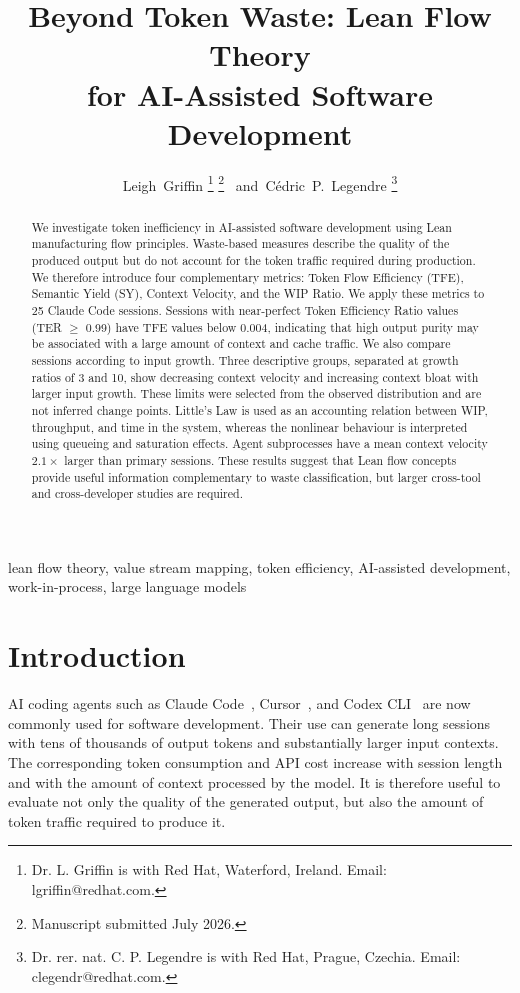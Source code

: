 \documentclass[journal]{IEEEtran}
\title{Beyond Token Waste: Lean Flow Theory\\
       for AI-Assisted Software Development}
\author{Leigh~Griffin%
  \thanks{Dr. L. Griffin is with Red Hat, Waterford, Ireland.
  Email: lgriffin@redhat.com.}%
  \thanks{Manuscript submitted July 2026.}%
  ~and~C\'{e}dric~P.~Legendre%
  \thanks{Dr. rer. nat. C. P. Legendre is with Red Hat, Prague, Czechia.
  Email: clegendr@redhat.com.}%
}
\begin{document}
\maketitle

\begin{abstract}
We investigate token inefficiency in AI-assisted software development using Lean manufacturing flow principles. Waste-based measures describe the quality of the produced output but do not account for the token traffic required during production. We therefore introduce four complementary metrics: Token Flow Efficiency (TFE), Semantic Yield (SY), Context Velocity, and the WIP Ratio. We apply these metrics to 25 Claude Code sessions. Sessions with near-perfect Token Efficiency Ratio values (TER $\geq$ 0.99) have TFE values below 0.004, indicating that high output purity may be associated with a large amount of context and cache traffic. We also compare sessions according to input growth. Three descriptive groups, separated at growth ratios of 3 and 10, show decreasing context velocity and increasing context bloat with larger input growth. These limits were selected from the observed distribution and are not inferred change points. Little's Law is used as an accounting relation between WIP, throughput, and time in the system, whereas the nonlinear behaviour is interpreted using queueing and saturation effects. Agent subprocesses have a mean context velocity $2.1\times$ larger than primary sessions. These results suggest that Lean flow concepts provide useful information complementary to waste classification, but larger cross-tool and cross-developer studies are required.
\end{abstract}

\begin{IEEEkeywords}
lean flow theory, value stream mapping, token efficiency, AI-assisted development, work-in-process, large language models
\end{IEEEkeywords}

\section{Introduction}
\label{sec:intro}

AI coding agents such as Claude Code~\cite{claude_code2025}, Cursor~\cite{cursor2024}, and Codex CLI~\cite{codex_cli2025} are now commonly used for software development. Their use can generate long sessions with tens of thousands of output tokens and substantially larger input contexts. The corresponding token consumption and API cost increase with session length and with the amount of context processed by the model. It is therefore useful to evaluate not only the quality of the generated output, but also the amount of token traffic required to produce it.
\end{document}

